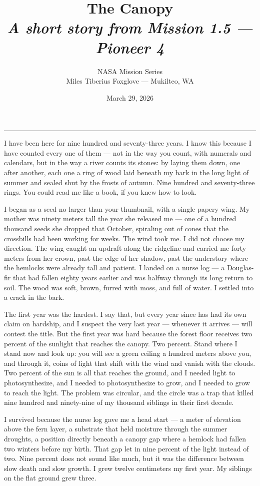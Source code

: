 \documentclass[12pt, letterpaper]{article}
\title{\Huge\textbf{The Canopy}\\[0.5em]\large\textit{A short story from Mission 1.5 --- Pioneer 4}}
\author{NASA Mission Series\\[0.3em]\small Miles Tiberius Foxglove --- Mukilteo, WA}
\date{March 29, 2026}
\begin{document}
\maketitle
\thispagestyle{empty}

\vspace{1em}
\noindent\rule{\textwidth}{0.4pt}
\vspace{1em}

\noindent I have been here for nine hundred and seventy-three years. I know this because I have counted every one of them --- not in the way you count, with numerals and calendars, but in the way a river counts its stones: by laying them down, one after another, each one a ring of wood laid beneath my bark in the long light of summer and sealed shut by the frosts of autumn. Nine hundred and seventy-three rings. You could read me like a book, if you knew how to look.

I began as a seed no larger than your thumbnail, with a single papery wing. My mother was ninety meters tall the year she released me --- one of a hundred thousand seeds she dropped that October, spiraling out of cones that the crossbills had been working for weeks. The wind took me. I did not choose my direction. The wing caught an updraft along the ridgeline and carried me forty meters from her crown, past the edge of her shadow, past the understory where the hemlocks were already tall and patient. I landed on a nurse log --- a Douglas-fir that had fallen eighty years earlier and was halfway through its long return to soil. The wood was soft, brown, furred with moss, and full of water. I settled into a crack in the bark.

The first year was the hardest. I say that, but every year since has had its own claim on hardship, and I suspect the very last year --- whenever it arrives --- will contest the title. But the first year was hard because the forest floor receives two percent of the sunlight that reaches the canopy. Two percent. Stand where I stand now and look up: you will see a green ceiling a hundred meters above you, and through it, coins of light that shift with the wind and vanish with the clouds. Two percent of the sun is all that reaches the ground, and I needed light to photosynthesize, and I needed to photosynthesize to grow, and I needed to grow to reach the light. The problem was circular, and the circle was a trap that killed nine hundred and ninety-nine of my thousand siblings in their first decade.

I survived because the nurse log gave me a head start --- a meter of elevation above the fern layer, a substrate that held moisture through the summer droughts, a position directly beneath a canopy gap where a hemlock had fallen two winters before my birth. That gap let in nine percent of the light instead of two. Nine percent does not sound like much, but it was the difference between slow death and slow growth. I grew twelve centimeters my first year. My siblings on the flat ground grew three.
\end{document}
